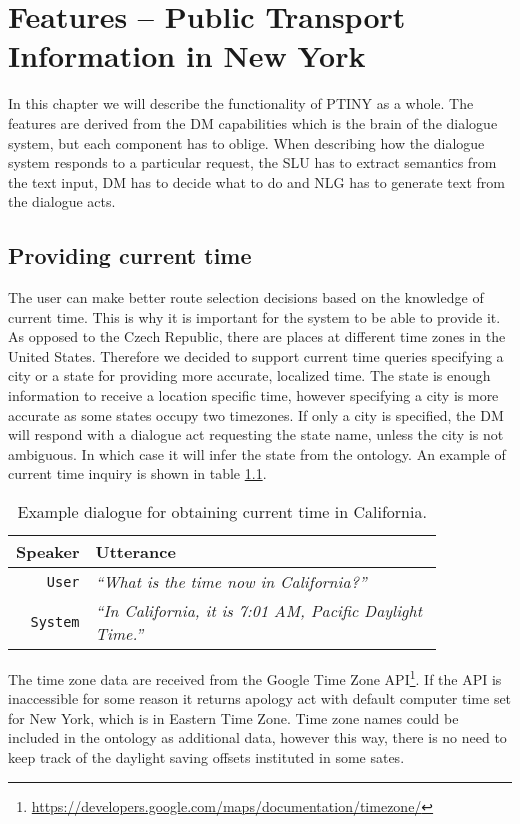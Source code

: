 \chapter{Features -- Public Transport Information in New York}

In this chapter we will describe the functionality of \ac{PTINY} as a whole.
The features are derived from the \ac{DM} capabilities which is the brain of the dialogue system, but each component has to oblige.
When describing how the dialogue system responds to a particular request, the \ac{SLU} has to extract semantics from the text input, \ac{DM} has to decide what to do and \ac{NLG} has to generate text from the dialogue acts.

\section{Providing current time} \label{sec:time}

The user can make better route selection decisions based on the knowledge of current time.
This is why it is important for the system to be able to provide it.
As opposed to the Czech Republic, there are places at different time zones in the United States.
Therefore we decided to support current time queries specifying a city or a state for providing more accurate, localized time.
The state is enough information to receive a location specific time, however specifying a city is more accurate as some states occupy two timezones.
If only a city is specified, the \ac{DM} will respond with a dialogue act requesting the state name, unless the city is not ambiguous.
In which case it will infer the state from the ontology.
An example of current time inquiry is shown in table \ref{table:time}.

\begin{table}[h]
\centering
\begin{tabular}{ | r | p{0.85\linewidth} | } \hline
	\textbf{Speaker} & \textbf{Utterance} \\ \hline
	\texttt{User} & \textit{``What is the time now in California?''} \\ \hline
	\texttt{System} & \textit{``In California, it is 7:01 AM, Pacific Daylight Time.''} \\ \hline
\end{tabular}
\caption[Current time in California]{Example dialogue for obtaining current time in California.}
\label{table:time}
\end{table}

The time zone data are received from the Google Time Zone \ac{API}\footnote{\url{https://developers.google.com/maps/documentation/timezone/}}.
If the \ac{API} is inaccessible for some reason it returns apology act with default computer time set for New York, which is in Eastern Time Zone.
Time zone names could be included in the ontology as additional data, however this way, there is no need to keep track of the daylight saving offsets instituted in some sates.

